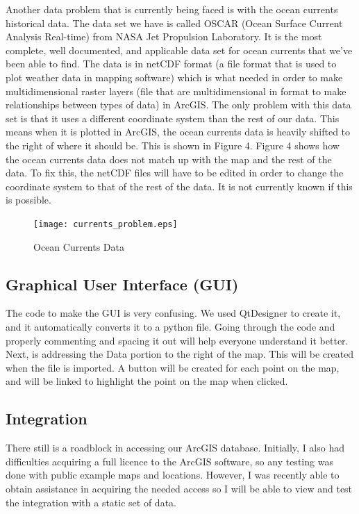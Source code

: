 \documentclass[onecolumn, draftclsnofoot,10pt, compsoc]{IEEEtran}
\begin{document}
Another data problem that is currently being faced is with the ocean currents historical data. The data set we have is called OSCAR (Ocean Surface Current Analysis Real-time)\cite{jpl} from NASA Jet Propulsion Laboratory. It is the most complete, well documented, and applicable data set for ocean currents that we've been able to find. The data is in netCDF format (a file format that is used to plot weather data in mapping software) which is what needed in order to make multidimensional raster layers (file that are multidimensional in format to make relationships between types of data) in ArcGIS. The only problem with this data set is that it uses a different coordinate system than the rest of our data. This means when it is plotted in ArcGIS, the ocean currents data is heavily shifted to the right of where it should be. This is shown in Figure 4. Figure 4 shows how the ocean currents data does not match up with the map and the rest of the data. To fix this, the netCDF files will have to be edited in order to change the coordinate system to that of the rest of the data. It is not currently known if this is possible.

\begin{figure}[H]
  \texttt{[image: currents\_problem.eps]}
  \caption{Ocean Currents Data}
\end{figure}

\subsection{Graphical User Interface (GUI)}
The code to make the GUI is very confusing. We used QtDesigner to create it, and it automatically converts it to a python file. Going through the code and properly commenting and spacing it out will help everyone understand it better. Next, is addressing the Data portion to the right of the map. This will be created when the file is imported. A button will be created for each point on the map, and will be linked to highlight the point on the map when clicked.
\subsection{Integration}
There still is a roadblock in accessing our ArcGIS database. Initially, I also had difficulties acquiring a full licence to the ArcGIS software, so any testing was done with public example maps and locations. However, I was recently able to obtain assistance in acquiring the needed access so I will be able to view and test the integration with a static set of data.
\end{document}
